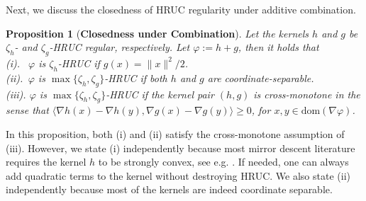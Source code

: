\documentclass{article}
\theoremstyle{plain}
\newtheorem{proposition}[theorem]{Proposition}
\theoremstyle{definition}
\theoremstyle{remark}
\newcommand{\dom}[1]{\mathrm{dom}(#1)}
\begin{document}
Next, we discuss the closedness of HRUC regularity under additive combination. 

\begin{proposition}[\textbf{Closedness under Combination}]
    \label{proposition:Affine 1} 
    Let the kernels $h$ and $g$ be $\zeta_h$- and $\zeta_g$-HRUC regular, respectively. Let $\varphi:= h+ g$, then it holds that  \vspace{0.1cm}\\
    \noindent\emph{(i).} $\,\,\,\varphi$ is $\zeta_h$-HRUC if $g(x) = \|x\|^2/2$.\vspace{0.1cm}\\
    \noindent\emph{(ii).} $\,\varphi$ is $\max\{\zeta_h,\zeta_g\}$-HRUC if both $h$ and $g$ are coordinate-separable.\vspace{0.1cm}\\
    \noindent\emph{(iii).} $\!\varphi$ is $\max\{\zeta_h,\zeta_g\}$-HRUC if the kernel pair $(h,g)$ is cross-monotone in the sense that 
    $\langle \nabla h(x)-\nabla h(y),  \nabla g(x)-\nabla g(y)\rangle \geq 0$,  for $x,y\in\dom{\nabla\varphi}$.
\end{proposition}

In this proposition, both (i) and (ii) satisfy the cross-monotone assumption of (iii). However, we state (i) independently because most mirror descent literature requires the kernel $h$ to be strongly convex, see e.g.  \cite{bolte2018first,fatkhullin2024taming,zhang2024stochastic}. If needed, one can always add quadratic terms to the kernel without destroying HRUC. We also state (ii) independently because most of the kernels are indeed coordinate separable. 
\end{document}
